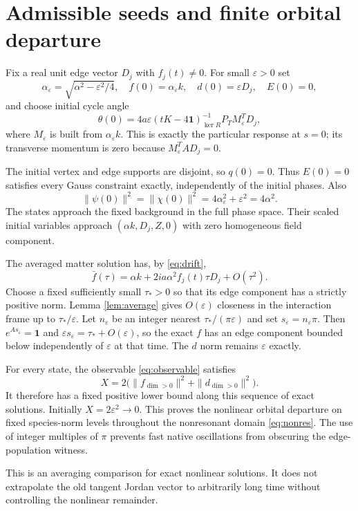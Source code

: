 \documentclass[11pt,a4paper]{article}
\newcommand{\id}{\mathbf1}\newcommand{\dd}{\mathrm d}\newcommand{\diag}{\operatorname{diag}}
\begin{document}
\newpage
\section{Admissible seeds and finite orbital departure}
Fix a real unit edge vector $D_j$ with $f_j(t)\ne0$. For small $\varepsilon>0$ set
\[
\alpha_\varepsilon=\sqrt{\alpha^2-\varepsilon^2/4},\quad
f(0)=\alpha_\varepsilon k,\quad d(0)=\varepsilon D_j,
\quad E(0)=0,
\]
and choose initial cycle angle
\begin{equation}
\theta(0)=4a\varepsilon(tK-4\id)^{-1}_{\ker R}P_TM_\varepsilon^TD_j,
\end{equation}
where $M_\varepsilon$ is built from $\alpha_\varepsilon k$. This is exactly the particular response at $s=0$; its transverse momentum is zero because $M_\varepsilon^TAD_j=0$.

The initial vertex and edge supports are disjoint, so $q(0)=0$. Thus $E(0)=0$ satisfies every Gauss constraint exactly, independently of the initial phases. Also
\[
\|\psi(0)\|^2=\|\chi(0)\|^2
=4\alpha_\varepsilon^2+\varepsilon^2=4\alpha^2.
\]
The states approach the fixed background in the full phase space. Their scaled initial variables approach $(\alpha k,D_j,Z,0)$ with zero homogeneous field component.

The averaged matter solution has, by \eqref{eq:drift},
\[
\bar f(\tau)=\alpha k+2ia\alpha^2f_j(t)\tau D_j+O(\tau^2).
\]
Choose a fixed sufficiently small $\tau_*>0$ so that its edge component has a strictly positive norm. Lemma \ref{lem:average} gives $O(\varepsilon)$ closeness in the interaction frame up to $\tau_*/\varepsilon$. Let $n_\varepsilon$ be an integer nearest $\tau_*/(\pi\varepsilon)$ and set $s_\varepsilon=n_\varepsilon\pi$. Then $e^{As_\varepsilon}=\id$ and $\varepsilon s_\varepsilon=\tau_*+O(\varepsilon)$, so the exact $f$ has an edge component bounded below independently of $\varepsilon$ at that time. The $d$ norm remains $\varepsilon$ exactly.

For every state, the observable \eqref{eq:observable} satisfies
\[
X=2\bigl(\|f_{\dim>0}\|^2+\|d_{\dim>0}\|^2\bigr).
\]
It therefore has a fixed positive lower bound along this sequence of exact solutions. Initially $X=2\varepsilon^2\to0$. This proves the nonlinear orbital departure on fixed species-norm levels throughout the nonresonant domain \eqref{eq:nonres}. The use of integer multiples of $\pi$ prevents fast native oscillations from obscuring the edge-population witness.

This is an averaging comparison for exact nonlinear solutions. It does not extrapolate the old tangent Jordan vector to arbitrarily long time without controlling the nonlinear remainder.
\end{document}
